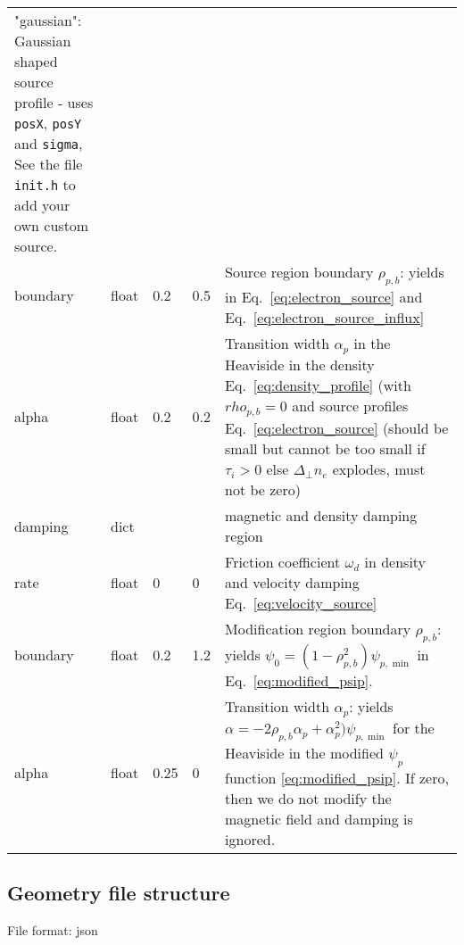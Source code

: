 \begin{longtable}{llllp{6cm}}
"gaussian": Gaussian shaped source profile - uses \texttt{posX}, \texttt{posY} and \texttt{sigma},
    See the file {\tt init.h} to add your own custom source.
\\
\qquad boundary & float & 0.2  & 0.5 & Source region boundary $\rho_{p,b}$: yields in Eq.~\eqref{eq:electron_source} and Eq.~\eqref{eq:electron_source_influx}  \\
\qquad alpha  & float & 0.2 & 0.2 & Transition width $\alpha_p$ in the Heaviside
in the density Eq.~\eqref{eq:density_profile} (with $rho_{p,b}=0$ and source profiles Eq.~\eqref{eq:electron_source} (should be
small but cannot be too small if $\tau_i > 0$ else $\Delta_\perp n_e$ explodes, must not be zero)
\\
damping & dict & & & magnetic and density damping region \\
\qquad rate & float & 0    & 0   & Friction coefficient $\omega_d$ in density and velocity damping Eq.~\eqref{eq:velocity_source} \\
\qquad boundary & float & 0.2  & 1.2 & Modification region boundary $\rho_{p,b}$: yields $\psi_0 = (1-\rho_{p,b}^2)\psi_{p,\min}$ in Eq.~\eqref{eq:modified_psip}.
\\
\qquad alpha   & float & 0.25 & 0 & Transition width $\alpha_p$: yields
$\alpha=-2\rho_{p,b}\alpha_p+\alpha_p^2)\psi_{p,\min}$ for the Heaviside in the modified
$\psi_p$ function \eqref{eq:modified_psip}. If zero, then we do not modify the
magnetic field and damping is ignored.\\
\bottomrule
\end{longtable}
\subsection{Geometry file structure} \label{sec:geometry_file}
File format: json

